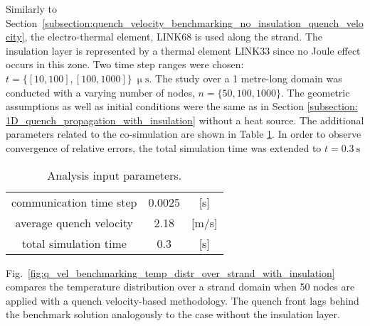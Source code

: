 
Similarly to Section~\ref{subsection:quench_velocity_benchmarking_no_insulation_quench_velocity}, the electro-thermal element, LINK68 is used along the strand. The insulation layer is represented by a thermal element LINK33 since no Joule effect occurs in this zone. Two time step ranges were chosen: $t=\{[10, 100], [100, 1000]\}~\upmu \text{s}$. The study over a 1 metre-long domain was conducted with a varying number of nodes, $n=\{50, 100, 1000\}$. The geometric assumptions as well as initial conditions were the same as in Section \ref{subsection: 1D_quench_propagation_with_insulation} without a heat source. The additional parameters related to the co-simulation are shown in Table \ref{table:1d_qv_benchmarking_geometry__with_insulation_parameters_quench_velocity}. In order to observe convergence of relative errors, the total simulation time was extended to $t=0.3~\text{s}$

\begin{table}[H]
    \caption{Analysis input parameters.} 
    \vspace{-1.em} 
    \fontsize{10}{10}
    \selectfont 
    \renewcommand{\arraystretch}{1.5}
    \begin{center}
        \begin{tabular}{ ccc }  
        \hline
        communication time step & 0.0025 & [s] \\
        average quench velocity & 2.18 & [m/s] \\
        total simulation time & 0.3 & [s] \\
        \hline 
        \end{tabular}
    \end{center}  
    \label{table:1d_qv_benchmarking_geometry__with_insulation_parameters_quench_velocity} 
\end{table}

Fig.~\ref{fig:q_vel_benchmarking_temp_distr_over_strand_with_insulation} compares the temperature distribution over a strand domain when 50 nodes are applied with a quench velocity-based methodology. The quench front lags behind the benchmark solution analogously to the case without the insulation layer.

